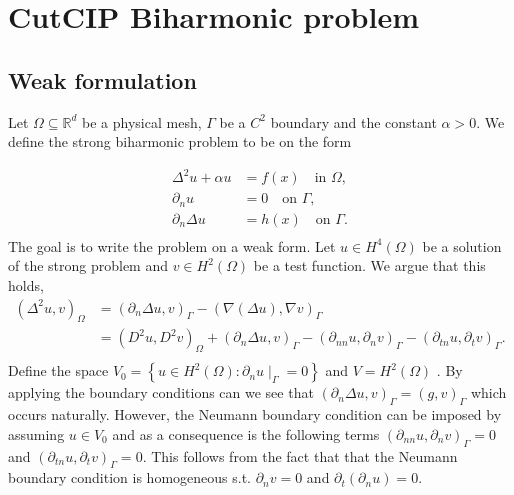 
\newpage
\section{CutCIP Biharmonic problem}%
\label{sec:cutcip_biharmonic_problem}

\subsection{Weak formulation}%
\label{sub:weak_formulation}


Let $\Omega \subseteq    \mathbb{R} ^d$ be a physical mesh, $\Gamma  $ be a $C^2$ boundary and the constant $\alpha >0$. We define the strong biharmonic problem to be on the form

\begin{equation}
\begin{split}
    \Delta^2  u  + \alpha  u  & = f( x)  \quad \text{in } \Omega,   \\
    \partial _{n} u & = 0  \quad \text{on } \Gamma ,  \\
    \partial _{n} \Delta  u & = h(x)  \quad \text{on } \Gamma  .  \\
\end{split}
\end{equation}
The goal is to write the problem on a weak form.
Let $u \in H^{4}( \Omega ) $ be a solution of the strong problem and $v \in H^{2}( \Omega ) $ be a test function. We argue that this holds,
    \[
        \begin{split}
(\Delta ^2u,v )_{\Omega } & = ( \partial _{n} \Delta u, v)_{\Gamma } - ( \nabla ( \Delta u) , \nabla v) _{\Gamma } \\
&= ( D^2u, D^2v)_{\Omega } + ( \partial _{n} \Delta u ,v)_{\Gamma } - ( \partial _{nn} u, \partial _{n}v)_{\Gamma } - ( \partial _{tn} u, \partial _{t} v)_{\Gamma }.        \\
        \end{split}
    \]
    Define the space $V_{0} = \left\{ u \in H^{2}( \Omega ) :  \partial _{n}u  \mid _{\Gamma } = 0 \right \} $ and $V = H^2( \Omega ) $ .
    By applying the boundary conditions can we see that $( \partial _{n} \Delta u, v)_\Gamma   = ( g,v)_{\Gamma }$ which occurs naturally. However, the Neumann boundary condition can be imposed by assuming $u \in V_{0}$ and
     as a consequence is the following terms $ ( \partial _{nn} u, \partial _{n}v)_{\Gamma }
    = 0$   and $( \partial _{tn} u, \partial _{t}v)_{\Gamma } = 0$. This follows from the fact that that the Neumann boundary condition is homogeneous s.t. $\partial _{n} v = 0$ and $\partial _{t} (\partial _{n}u) = 0 $.


